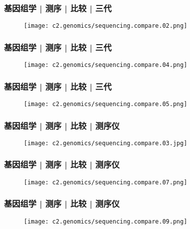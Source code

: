 \begin{frame}
  \frametitle{基因组学 | 测序 | 比较 | 三代}
  \begin{figure}
    \centering
    \texttt{[image: c2.genomics/sequencing.compare.02.png]}
  \end{figure}
\end{frame}


\begin{frame}
  \frametitle{基因组学 | 测序 | 比较 | 三代}
  \begin{figure}
    \centering
    \texttt{[image: c2.genomics/sequencing.compare.04.png]}
  \end{figure}
\end{frame}

\begin{frame}
  \frametitle{基因组学 | 测序 | 比较 | 三代}
  \begin{figure}
    \centering
    \texttt{[image: c2.genomics/sequencing.compare.05.png]}
  \end{figure}
\end{frame}

\begin{frame}
  \frametitle{基因组学 | 测序 | 比较 | 测序仪}
  \begin{figure}
    \centering
    \texttt{[image: c2.genomics/sequencing.compare.03.jpg]}
  \end{figure}
\end{frame}

\begin{frame}
  \frametitle{基因组学 | 测序 | 比较 | 测序仪}
  \begin{figure}
    \centering
    \texttt{[image: c2.genomics/sequencing.compare.07.png]}
  \end{figure}
\end{frame}


\begin{frame}
  \frametitle{基因组学 | 测序 | 比较 | 测序仪}
  \begin{figure}
    \centering
    \texttt{[image: c2.genomics/sequencing.compare.09.png]}
  \end{figure}
\end{frame}

